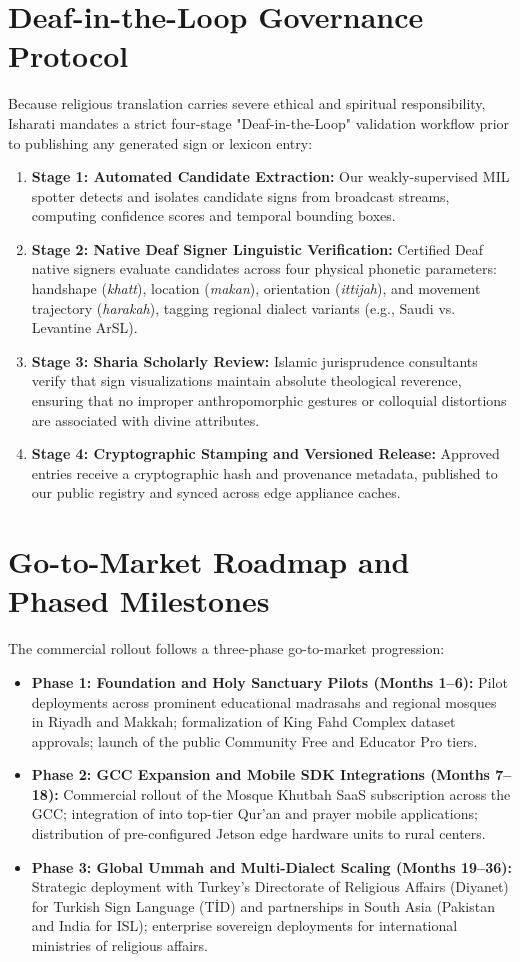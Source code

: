 \section{Deaf-in-the-Loop Governance Protocol}
\label{sec:biz_governance}
Because religious translation carries severe ethical and spiritual responsibility, Isharati mandates a strict four-stage "Deaf-in-the-Loop" validation workflow prior to publishing any generated sign or lexicon entry:
\begin{enumerate}[leftmargin=*,itemsep=3pt]
  \item \textbf{Stage 1: Automated Candidate Extraction:} Our weakly-supervised MIL spotter detects and isolates candidate signs from broadcast streams, computing confidence scores and temporal bounding boxes.
  \item \textbf{Stage 2: Native Deaf Signer Linguistic Verification:} Certified Deaf native signers evaluate candidates across four physical phonetic parameters: handshape (\textit{khatt}), location (\textit{makan}), orientation (\textit{ittijah}), and movement trajectory (\textit{harakah}), tagging regional dialect variants (e.g., Saudi vs. Levantine ArSL).
  \item \textbf{Stage 3: Sharia Scholarly Review:} Islamic jurisprudence consultants verify that sign visualizations maintain absolute theological reverence, ensuring that no improper anthropomorphic gestures or colloquial distortions are associated with divine attributes.
  \item \textbf{Stage 4: Cryptographic Stamping and Versioned Release:} Approved entries receive a cryptographic hash and provenance metadata, published to our public registry and synced across edge appliance caches.
\end{enumerate}

\section{Go-to-Market Roadmap and Phased Milestones}
\label{sec:biz_roadmap}
The commercial rollout follows a three-phase go-to-market progression:
\begin{itemize}[leftmargin=*,itemsep=2pt]
  \item \textbf{Phase 1: Foundation and Holy Sanctuary Pilots (Months 1--6):}
    Pilot deployments across prominent educational madrasahs and regional mosques in Riyadh and Makkah; formalization of King Fahd Complex dataset approvals; launch of the public Community Free and Educator Pro tiers.
  \item \textbf{Phase 2: GCC Expansion and Mobile SDK Integrations (Months 7--18):}
    Commercial rollout of the Mosque Khutbah SaaS subscription across the GCC; integration of  into top-tier Qur'an and prayer mobile applications; distribution of pre-configured Jetson edge hardware units to rural centers.
  \item \textbf{Phase 3: Global Ummah and Multi-Dialect Scaling (Months 19--36):}
    Strategic deployment with Turkey's Directorate of Religious Affairs (Diyanet) for Turkish Sign Language (T\.ID) and partnerships in South Asia (Pakistan and India for ISL); enterprise sovereign deployments for international ministries of religious affairs.
\end{itemize}
